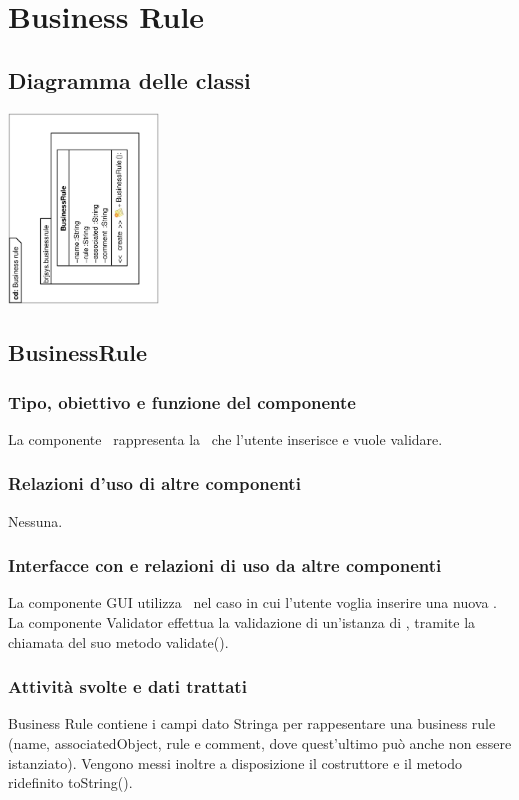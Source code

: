 \documentclass[11pt,titlepage,a4paper]{report}
\begin{document}
\section{Business Rule}
\subsection{Diagramma delle classi}
\begin{center}
\includegraphics[width=0.3\textwidth, angle=-90]{DiagrammaClassi/Businessrule.eps}
\end{center}
\subsection{BusinessRule}
\subsubsection{Tipo, obiettivo e funzione del componente}
La componente \BR\ rappresenta la \br\ che l'utente inserisce e vuole validare.
\subsubsection{Relazioni d'uso di altre componenti}
Nessuna.
\subsubsection{Interfacce con e relazioni di uso da altre componenti}
La componente GUI utilizza \BR\ nel caso in cui l'utente voglia inserire una nuova \br.
La componente Validator effettua la validazione di un'istanza di \BR, tramite la chiamata del suo metodo validate().
\subsubsection{Attivit\`a svolte e dati trattati}
Business Rule contiene i campi dato Stringa per rappesentare una business rule (name, associatedObject, rule e comment, dove quest'ultimo pu\`o anche non essere istanziato). Vengono messi inoltre a disposizione il costruttore e il metodo ridefinito toString().
\end{document}
